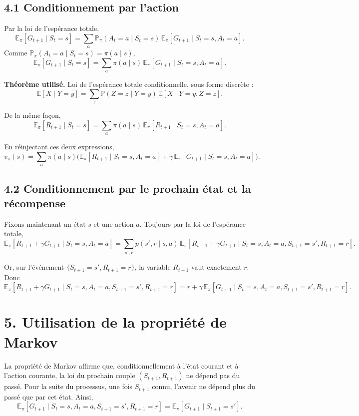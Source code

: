 \documentclass[11pt,a4paper]{article}
\begin{document}
\subsection*{4.1 Conditionnement par l'action}

Par la loi de l'espérance totale,
\[
\mathbb E_\pi[G_{t+1}\mid S_t=s]
=\sum_a \mathbb P_\pi(A_t=a\mid S_t=s)\,\mathbb E_\pi[G_{t+1}\mid S_t=s,A_t=a].
\]
Comme $\mathbb P_\pi(A_t=a\mid S_t=s)=\pi(a\mid s)$,
\[
\mathbb E_\pi[G_{t+1}\mid S_t=s]
=\sum_a \pi(a\mid s)\,\mathbb E_\pi[G_{t+1}\mid S_t=s,A_t=a].
\]

\textbf{Théorème utilisé.}
Loi de l'espérance totale conditionnelle, sous forme discrète :
\[
\mathbb E[X\mid Y=y]=\sum_z \mathbb P(Z=z\mid Y=y)\,\mathbb E[X\mid Y=y,Z=z].
\]

De la même façon,
\[
\mathbb E_\pi[R_{t+1}\mid S_t=s]
=\sum_a \pi(a\mid s)\,\mathbb E_\pi[R_{t+1}\mid S_t=s,A_t=a].
\]

En réinjectant ces deux expressions,
\[
v_\pi(s)
=\sum_a \pi(a\mid s)\Big(
\mathbb E_\pi[R_{t+1}\mid S_t=s,A_t=a]
+\gamma\,\mathbb E_\pi[G_{t+1}\mid S_t=s,A_t=a]
\Big).
\]

\subsection*{4.2 Conditionnement par le prochain état et la récompense}

Fixons maintenant un état $s$ et une action $a$. Toujours par la loi de l'espérance totale,
\[
\mathbb E_\pi[R_{t+1}+\gamma G_{t+1}\mid S_t=s,A_t=a]
=\sum_{s',r} p(s',r\mid s,a)\,\mathbb E_\pi[R_{t+1}+\gamma G_{t+1}\mid S_t=s,A_t=a,S_{t+1}=s',R_{t+1}=r].
\]

Or, sur l'événement $\{S_{t+1}=s',R_{t+1}=r\}$, la variable $R_{t+1}$ vaut exactement $r$. Donc
\[
\mathbb E_\pi[R_{t+1}+\gamma G_{t+1}\mid S_t=s,A_t=a,S_{t+1}=s',R_{t+1}=r]
= r + \gamma\,\mathbb E_\pi[G_{t+1}\mid S_t=s,A_t=a,S_{t+1}=s',R_{t+1}=r].
\]

\section*{5. Utilisation de la propriété de Markov}

La propriété de Markov affirme que, conditionnellement à l'état courant et à l'action courante, la loi du prochain couple $(S_{t+1},R_{t+1})$ ne dépend pas du passé. Pour la suite du processus, une fois $S_{t+1}$ connu, l'avenir ne dépend plus du passé que par cet état. Ainsi,
\[
\mathbb E_\pi[G_{t+1}\mid S_t=s,A_t=a,S_{t+1}=s',R_{t+1}=r]
=\mathbb E_\pi[G_{t+1}\mid S_{t+1}=s'].
\]
\end{document}
